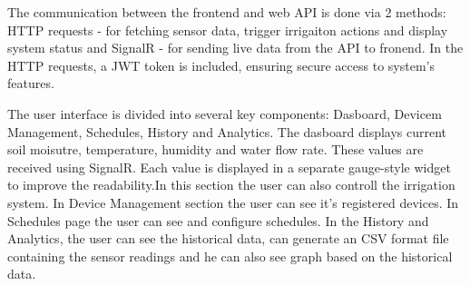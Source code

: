 The communication between the frontend and web API is done via 2 methods: HTTP requests - for fetching sensor data, trigger
irrigaiton actions and display system status and SignalR - for sending live data from the API to fronend. In the HTTP requests,
a JWT token is included, ensuring secure access to system's features.

The user interface is divided into several key components: Dasboard, Devicem Management, Schedules, History and Analytics.
The dasboard displays current soil moisutre, temperature, humidity and water flow rate. 
These values are received using SignalR. 
Each value is displayed in a separate gauge-style widget to improve the readability.In this section the user can also controll the irrigation system.
In Device Management section the user
can see it's registered devices. In Schedules page the user can see and configure schedules. In the History and Analytics, the user can
see the historical data, can generate an CSV format file containing the sensor readings and he can also see graph based on the 
historical data.

